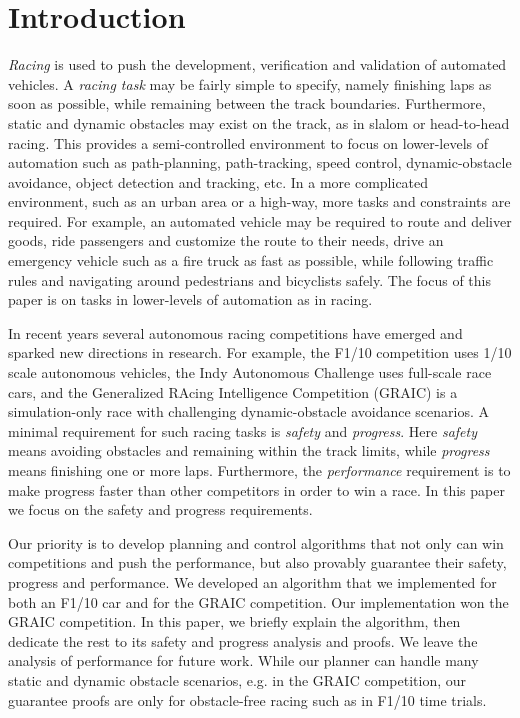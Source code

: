 \section{Introduction}
\emph{Racing} is used to push the development, verification and validation of automated vehicles.
%
A \emph{racing task} may be fairly simple to specify, namely finishing laps as soon as possible, while remaining between the track boundaries.
%
Furthermore, static and dynamic obstacles may exist on the track, as in slalom or head-to-head racing.
%
This provides a semi-controlled environment to focus on lower-levels of automation such as path-planning, path-tracking, speed control, dynamic-obstacle avoidance, object detection and tracking, etc.
%
In a more complicated environment, such as an urban area or a high-way, more tasks and constraints are required.
%
For example, an automated vehicle may be required to route and deliver goods, ride passengers and customize the route to their needs, drive an emergency vehicle such as a fire truck as fast as possible, while following traffic rules and navigating around pedestrians and bicyclists safely.
%
The focus of this paper is on tasks in lower-levels of automation as in racing.


In recent years several autonomous racing competitions have emerged and sparked new directions in research.
%
For example, the F1/10 competition uses 1/10 scale autonomous vehicles, the Indy Autonomous Challenge uses full-scale race cars, and the Generalized RAcing Intelligence Competition (GRAIC) is a simulation-only race with challenging dynamic-obstacle avoidance scenarios.
%
A minimal requirement for such racing tasks is \emph{safety} and \emph{progress}.
%
Here \emph{safety} means avoiding obstacles and remaining within the track limits, while \emph{progress} means finishing one or more laps.
%
Furthermore, the \emph{performance} requirement is to make progress faster than other competitors in order to win a race.
%
In this paper we focus on the safety and progress requirements.


Our priority is to develop planning and control algorithms that not only can win competitions and push the performance, but also provably guarantee their safety, progress and performance.
%
We developed an algorithm that we implemented for both an F1/10 car and for the GRAIC competition.
%
Our implementation won the GRAIC competition.
%
In this paper, we briefly explain the algorithm, then dedicate the rest to its safety and progress analysis and proofs.
%
We leave the analysis of performance for future work.
%
While our planner can handle many static and dynamic obstacle scenarios, e.g. in the GRAIC competition, our guarantee proofs are only for obstacle-free racing such as in F1/10 time trials.


